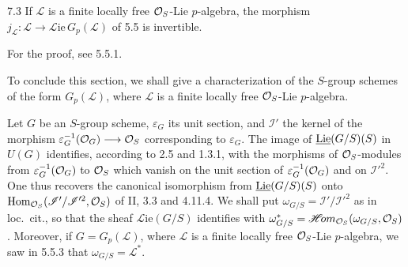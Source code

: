 \begin{lemma}{7.3}\label{VIIA.7.3}
If $\mathscr L$ is a finite locally free $\mathcal{O}_S$-Lie $p$-algebra, the morphism $j_{\mathscr L}:\mathscr L\to\mathscr L\!\mathrm{ie}\,G_p(\mathscr L)$ of 5.5 is invertible.
\end{lemma}
For the proof, see 5.5.1.

To conclude this section, we shall give a characterization of the $S$-group schemes of the form $G_p(\mathscr L)$, where $\mathscr L$ is a finite locally free $\mathcal{O}_S$-Lie $p$-algebra.

Let $G$ be an $S$-group scheme, $\varepsilon_G$ its unit section, and $\mathscr I'$ the kernel of the morphism $\varepsilon_G^{-1}(\mathcal{O}_G)\longrightarrow\mathcal{O}_S$ corresponding to $\varepsilon_G$. The image of $\underline{\operatorname{Lie}}(G/S)(S)$ in $U(G)$ identifies, according to 2.5 and 1.3.1, with the morphisms of $\mathcal{O}_S$-modules from $\varepsilon_G^{-1}(\mathcal{O}_G)$ to $\mathcal{O}_S$ which vanish on the unit section of $\varepsilon_G^{-1}(\mathcal{O}_G)$ and on $\mathscr I'^2$. One thus recovers the canonical isomorphism from $\underline{\operatorname{Lie}}(G/S)(S)$ onto $\operatorname{Hom}_{\mathcal{O}_S}(\mathscr I'/\mathscr I'^2,\mathcal{O}_S)$ of II, 3.3 and 4.11.4. We shall put $\omega_{G/S}=\mathscr I'/\mathscr I'^2$ as in loc.\ cit., so that the sheaf $\mathscr L\!\mathrm{ie}(G/S)$ identifies with $\omega_{G/S}^*=\mathscr H\!om_{\mathcal{O}_S}(\omega_{G/S},\mathcal{O}_S)$. Moreover, if $G=G_p(\mathscr L)$, where $\mathscr L$ is a finite locally free $\mathcal{O}_S$-Lie $p$-algebra, we saw in 5.5.3 that $\omega_{G/S}=\mathscr L^*$.

